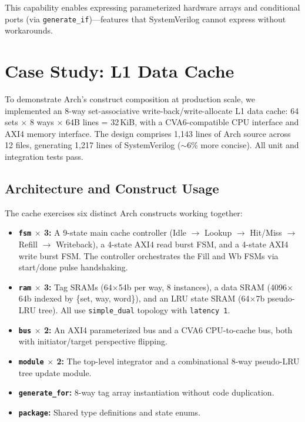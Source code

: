 \documentclass[11pt,twocolumn]{article}
\begin{document}
This capability enables expressing parameterized hardware arrays and conditional ports (via \texttt{generate\_if})---features that SystemVerilog cannot express without workarounds.

\section{Case Study: L1 Data Cache}\label{sec:example}

To demonstrate Arch's construct composition at production scale, we implemented an 8-way set-associative write-back/write-allocate L1 data cache: 64 sets $\times$ 8 ways $\times$ 64B lines = 32\,KiB, with a CVA6-compatible CPU interface and AXI4 memory interface. The design comprises 1,143 lines of Arch source across 12 files, generating 1,217 lines of SystemVerilog (${\sim}$6\% more concise). All unit and integration tests pass.

\subsection{Architecture and Construct Usage}

The cache exercises six distinct Arch constructs working together:

\begin{itemize}
\item \textbf{\texttt{fsm} $\times$ 3:} A 9-state main cache controller (Idle $\to$ Lookup $\to$ Hit/Miss $\to$ Refill $\to$ Writeback), a 4-state AXI4 read burst FSM, and a 4-state AXI4 write burst FSM. The controller orchestrates the Fill and Wb FSMs via start/done pulse handshaking.
\item \textbf{\texttt{ram} $\times$ 3:} Tag SRAMs (64$\times$54b per way, 8 instances), a data SRAM (4096$\times$64b indexed by \{set, way, word\}), and an LRU state SRAM (64$\times$7b pseudo-LRU tree). All use \texttt{simple\_dual} topology with \texttt{latency 1}.
\item \textbf{\texttt{bus} $\times$ 2:} An AXI4 parameterized bus and a CVA6 CPU-to-cache bus, both with initiator/target perspective flipping.
\item \textbf{\texttt{module} $\times$ 2:} The top-level integrator and a combinational 8-way pseudo-LRU tree update module.
\item \textbf{\texttt{generate\_for}:} 8-way tag array instantiation without code duplication.
\item \textbf{\texttt{package}:} Shared type definitions and state enums.
\end{itemize}
\end{document}
